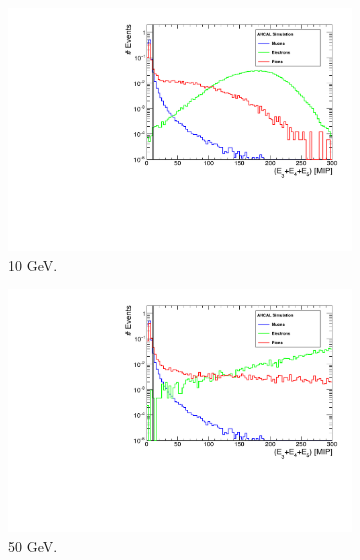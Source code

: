 \begin{figure}[htbp!]
	\begin{subfigure}[t]{0.45\textwidth}
		\centering
		\includegraphics[width=1\linewidth]{chap5/fig_AHCAL_timing/Electrons/SelectionCut_EnergyE3_10GeV}
		\caption{10 GeV.} \label{fig:e10GeV_E3}
	\end{subfigure}
	\hfill
	\begin{subfigure}[t]{0.45\textwidth}
		\centering
		\includegraphics[width=1\linewidth]{chap5/fig_AHCAL_timing/Electrons/SelectionCut_EnergyE3_50GeV}
		\caption{50 GeV.} \label{fig:e50GeV_E3}
	\end{subfigure}
	\hfill
	\begin{subfigure}[t]{0.45\textwidth}
		\centering

\end{subfigure}
\end{figure}
